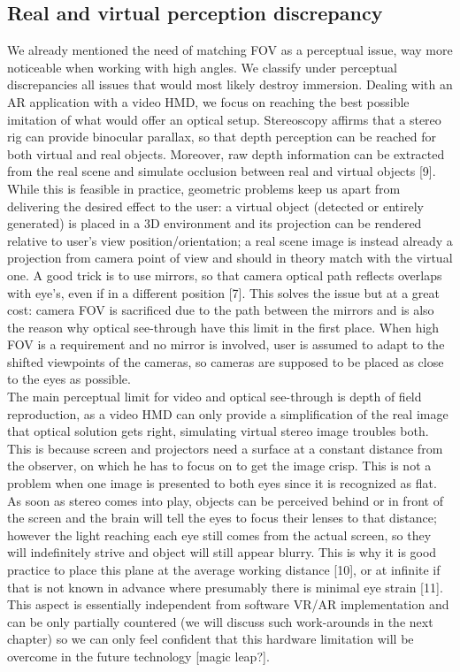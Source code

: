 \subsection{Real and virtual perception discrepancy}
We already mentioned the need of matching FOV as a perceptual issue, way more noticeable when working with high angles. We classify under perceptual discrepancies all issues that would most likely destroy immersion. Dealing with an AR application with a video HMD, we focus on reaching the best possible imitation of what would offer an optical setup. Stereoscopy affirms that a stereo rig can provide binocular parallax, so that depth perception can be reached for both virtual and real objects. Moreover, raw depth information can be extracted from the real scene and simulate occlusion between real and virtual objects [9].\\
While this is feasible in practice, geometric problems keep us apart from delivering the desired effect to the user: a virtual object (detected or entirely generated) is placed in a 3D environment and its projection can be rendered relative to user's view position/orientation; a real scene image is instead already a projection from camera point of view and should in theory match with the virtual one. A good trick is to use mirrors, so that camera optical path reflects overlaps with eye's, even if in a different position [7]. This solves the issue but at a great cost: camera FOV is sacrificed due to the path between the mirrors and is also the reason why optical see-through have this limit in the first place. When high FOV is a requirement and no mirror is involved, user is assumed to adapt to the shifted viewpoints of the cameras, so cameras are supposed to be placed as close to the eyes as possible.\\
The main perceptual limit for video and optical see-through is depth of field reproduction, as a video HMD can only provide a simplification of the real image that optical solution gets right, simulating virtual stereo image troubles both. This is because screen and projectors need a surface at a constant distance from the observer, on which he has to focus on to get the image crisp. This is not a problem when one image is presented to both eyes since it is recognized as flat. As soon as stereo comes into play, objects can be perceived behind or in front of the screen and the brain will tell the eyes to focus their lenses to that distance; however the light reaching each eye still comes from the actual screen, so they will indefinitely strive and object will still appear blurry. This is why it is good practice to place this plane at the average working distance [10], or at infinite if that is not known in advance where presumably there is minimal eye strain [11]. This aspect is essentially independent from software VR/AR implementation and can be only partially countered (we will discuss such work-arounds in the next chapter) so we can only feel confident that this hardware limitation will be overcome in the future technology [magic leap?].\\
